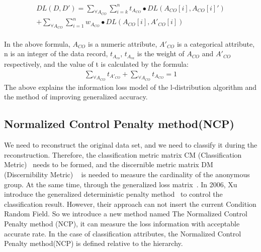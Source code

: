\documentclass[journal,transmag]{IEEEtran}
\begin{document}
\begin{eqnarray}
\begin{aligned}
DL (D, D')=\sum_{ \forall A_{CO}} \sum_{i=k}^n t_{A_{CO}}  \bullet DL (A_{CO}[i], A_{CO}[i]') \\
+\sum_{\forall A_{CO}} \sum_{i=1}^n w_{A_{CO}}\bullet DL (A_{CO} [i], A'_{CO} [i])  \quad
\end{aligned}
\end{eqnarray}

In the above formula, $ A_{CO} $ is a numeric attribute, $ A'_{CO} $ is a categorical attribute, n is an integer of the data record, $t_{A_{co}}$, $t_{A_{ca}}$ is the weight of $ A_ {CO} $ and $ A '_ {CO} $ respectively, and the value of t is calculated by the formula:
\begin{eqnarray}
\sum_{\forall A_{CO}} t_{A'_{CO}}+\sum_{\forall A_{CO}} t_{A_{CO}} =1
\end{eqnarray}
The above explains the information loss model of the l-distribution algorithm and the method of improving generalized accuracy.



\subsection{Normalized Control Penalty method(NCP)}
We need to reconstruct the original data set, and we need to classify it during the reconstruction. Therefore, the classification metric matrix CM (Classification Metric)~\cite{dalvi2007efficient} needs to be formed, and the discernible metric matrix DM (Discernibility Metric) ~\cite{bayardo2005data} is needed to measure the cardinality of the anonymous group. At the same time, through the generalized loss matrix~\cite{dalvi2007efficient}. In 2006, Xu introduce the generalized deterministic penalty method~\cite{xu2006utility} to control the classification result. However, their approach can not insert the current Condition Random Field.
So we introduce a new method named The Normalized Control Penalty method (NCP), it can measure the loss information with acceptable accurate rate. In the case of classification attributes, the Normalized Control Penalty method(NCP) is defined relative to the hierarchy.
\end{document}
